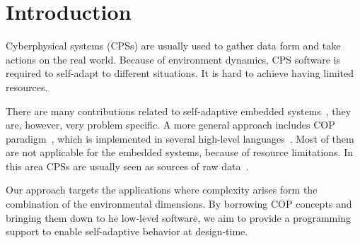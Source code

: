 \section{Introduction}
Cyberphysical systems (CPSs) are usually used to gather data form and take actions
on the real world. Because of environment dynamics, CPS software is required to
self-adapt to different situations. It is hard to achieve having limited resources.

There are many contributions related to self-adaptive embedded
systems~\cite{Zimmerling12,Bourdenas11}, they are, however, very problem
specific. A more general approach includes COP paradigm~\cite{Hirschfeld08},
which is implemented in several high-level
languages~\cite{Bardram05,Ghezzi10,Kamina11,Salvaneschi12,Sehic11}. Most of them
are not applicable for the embedded systems, because of resource limitations. In
this area CPSs are usually seen as sources of raw data~\cite{Sehic11}.

Our approach targets the applications where complexity arises form the
combination of the environmental dimensions. By borrowing COP concepts and
bringing them down to he low-level software, we aim to provide a programming 
support to enable self-adaptive behavior at design-time.